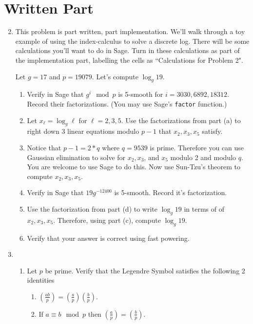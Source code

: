 \documentclass[11pt]{article}
\begin{document}
\section*{Written Part}
\begin{enumerate}
  \setcounter{enumi}{1}
  \item{
  This problem is part written, part implementation.  We'll walk through a toy example of using the index-calculus to solve a discrete log.  There will be some calculations you'll want to do in Sage.  Turn in these calculations as part of the implementation part, labelling the cells as ``Calculations for Problem 2".

  Let $g = 17$ and $p=19079$.  Let's compute $\log_g 19$.
  \begin{enumerate}
    \item{Verify in Sage that $g^i\mod p$ is 5-smooth for $i=3030,6892,18312$.  Record their factorizations.  (You may use Sage's \verb|factor| function.)}
    \item{Let $x_\ell = \log_g\ell$ for $\ell=2,3,5$.  Use the factorizations from part (a) to right down 3 linear equations modulo $p-1$ that $x_2,x_3,x_5$ satisfy.}
    \item{Notice that $p-1 = 2*q$ where $q = 9539$ is prime.  Therefore you can use Gaussian elimination to solve for $x_2,x_3$, and $x_5$ modulo 2 and modulo $q$.  You are welcome to use Sage to do this.  Now use Sun-Tzu's theorem to compute $x_2,x_3,x_5$.}
    \item{Verify in Sage that $19g^{-12400}$ is 5-smooth.  Record it's factorization.}
    \item{Use the factorization from part (d) to write $\log_g19$ in terms of of $x_2,x_3,x_5$.  Therefore, using part (c), compute $\log_g19$.}
    \item{Verify that your answer is correct using fast powering.}
  \end{enumerate}
  }
  \item{
  \begin{enumerate}
    \item{Let $p$ be prime.  Verify that the Legendre Symbol satisfies the following 2 identities}
    \begin{enumerate}
      \item{
      $\left(\frac{ab}{p}\right) = \left(\frac{a}{p}\right)\left(\frac{b}{p}\right)$.
      }
      \item{
      If $a\equiv b\mod p$ then $\left(\frac{a}{p}\right) = \left(\frac{b}{p}\right)$.
      }
    \end{enumerate}

\end{enumerate}}
\end{enumerate}
\end{document}
